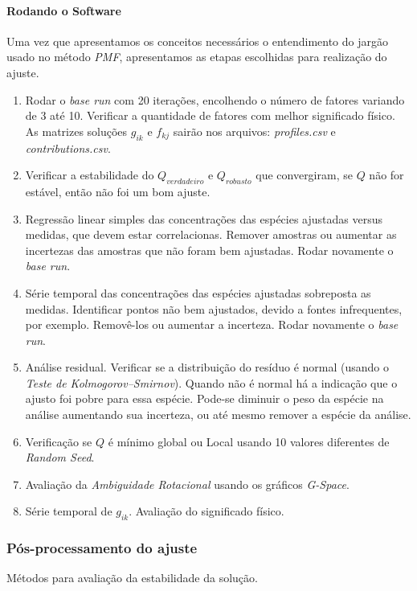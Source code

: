 \paragraph{Rodando o Software}

Uma vez que apresentamos os conceitos necessários o entendimento do jargão 
usado no método \textit{PMF}, apresentamos as etapas escolhidas para realização 
do ajuste.

\begin{enumerate}
  \item Rodar o \textit{base run} com 20 iterações, encolhendo o número de 
        fatores variando de 3 até 10. 
        Verificar a quantidade de fatores com melhor significado físico. 
        As matrizes soluções $g_{ik}$ e $f_{kj}$ sairão nos arquivos: 
        \textit{profiles.csv} e \textit{contributions.csv}.
  \item Verificar a estabilidade do $Q_{verdadeiro}$ e $Q_{robusto}$ que 
        convergiram, se $Q$ não for estável, então não foi um bom ajuste.
  \item Regressão linear simples das concentrações das espécies ajustadas 
        versus medidas, que devem estar correlacionas. 
        Remover amostras ou aumentar as incertezas das amostras que não foram 
        bem ajustadas. Rodar novamente o \textit{base run}.  
  \item Série temporal das concentrações das espécies ajustadas sobreposta
        as medidas. 
        Identificar pontos não bem ajustados, devido a fontes infrequentes, 
        por exemplo.
        Removê-los ou aumentar a incerteza. Rodar novamente o \textit{base run}.
  \item Análise residual. Verificar se a distribuição do resíduo é normal 
        (usando o \textit{Teste de Kolmogorov–Smirnov}). 
        Quando não é normal há a indicação que o ajusto foi pobre para essa 
        espécie. 
        Pode-se diminuir o peso da espécie na análise aumentando sua incerteza, 
        ou até mesmo remover a espécie da análise.
  \item Verificação se $Q$ é mínimo global ou Local usando 10 valores 
        diferentes de \textit{Random Seed}.
  \item Avaliação da \textit{Ambiguidade Rotacional} usando os 
        gráficos \textit{G-Space}.
  \item Série temporal de $g_{ik}$. Avaliação do significado físico.
\end{enumerate}

\subsubsection{Pós-processamento do ajuste}
Métodos para avaliação da estabilidade da solução.

